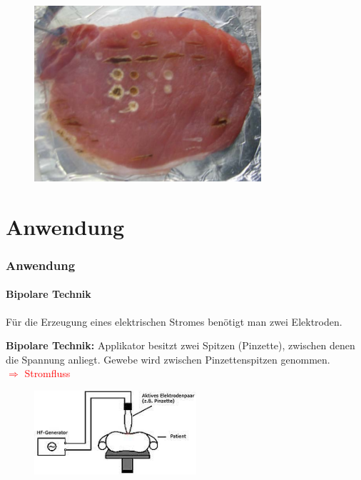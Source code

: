 \documentclass{beamer}
\begin{document}
\begin{frame}
	\begin{figure}
		\centering
		\includegraphics[]{images/fleisch.png}
	\end{figure}
\end{frame}


\section{Anwendung}
\begin{frame}
\frametitle{Anwendung}
\framesubtitle{Bipolare Technik}
	\begin{center}
		Für die Erzeugung eines elektrischen Stromes benötigt man zwei Elektroden.
	\end{center}
	\textbf{Bipolare Technik:}
	Applikator besitzt zwei Spitzen (Pinzette), zwischen denen die Spannung anliegt. Gewebe wird zwischen Pinzettenspitzen genommen. \\\textcolor{red}{$\Rightarrow$ Stromfluss}
	\begin{figure}
		\centering
		\includegraphics[width=6cm]{images/_bipolareTechnik.png}
		\cite{wiki:HF}
	\end{figure}
\end{frame}
\end{document}
